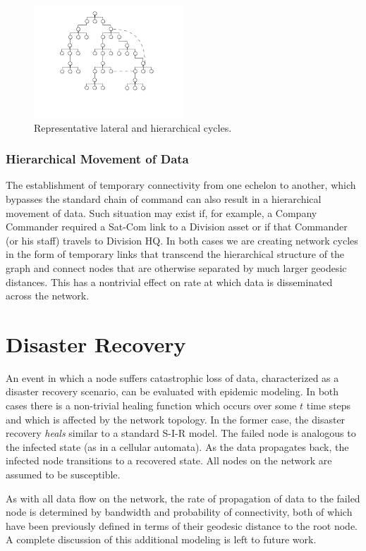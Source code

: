\documentclass[10pt]{./IEEEtran}
\begin{document}
\begin{figure}[h!]
  \centering
    \includegraphics[width=0.5\textwidth]{images/network}
  \caption{Representative lateral and hierarchical cycles.}
  \label{fig:network}
\end{figure}

\subsubsection{Hierarchical Movement of Data}
The establishment of temporary connectivity from one echelon to another, which bypasses the standard chain of command can also result in a hierarchical movement of data.  Such situation may exist if, for example, a Company Commander required a Sat-Com link to a Division asset or if that Commander (or his staff) travels to Division HQ.  In both cases we are creating network cycles in the form of temporary links that transcend the hierarchical structure of the graph and connect nodes that are otherwise separated by much larger geodesic distances.  This has a nontrivial effect\cite{Ganesh:2005} on rate at which data is disseminated across the network.


\section{Disaster Recovery}
\label{sec:dr}
An event in which a node suffers catastrophic loss of data, characterized as a disaster recovery scenario, can be evaluated with epidemic modeling.  In both cases there is a non-trivial healing function which occurs over some $t$ time steps and which is affected by the network topology\cite{Ganesh:2005}.  In the former case, the disaster recovery \emph{heals} similar to a standard S-I-R model.  The failed node is analogous to the infected state (as in a cellular automata).  As the data propagates back, the infected node transitions to a recovered state.  All nodes on the network are assumed to be susceptible.  

As with all data flow on the network, the rate of propagation of data to the failed node is determined by bandwidth and probability of connectivity, both of which have been previously defined in terms of their geodesic distance to the root node.  A complete discussion of this additional modeling is left to future work.
\end{document}
